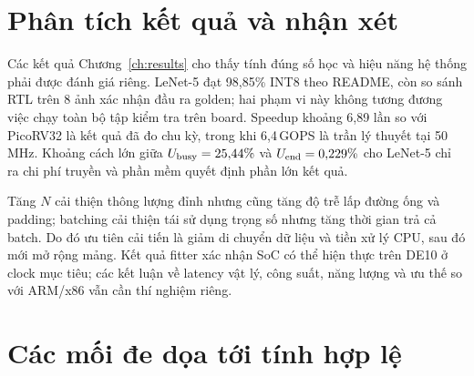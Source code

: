 \section{Phân tích kết quả và nhận xét}
\label{sec:analysis-remarks}
Các kết quả Chương~\ref{ch:results} cho thấy tính đúng số học và hiệu năng hệ thống phải được đánh giá riêng. LeNet-5 đạt 98,85\% INT8 theo README, còn so sánh RTL trên 8 ảnh xác nhận đầu ra golden; hai phạm vi này không tương đương việc chạy toàn bộ tập kiểm tra trên board. Speedup khoảng 6,89 lần so với PicoRV32 là kết quả đã đo chu kỳ, trong khi 6,4\,GOPS là trần lý thuyết tại 50\,MHz. Khoảng cách lớn giữa $U_{\rm busy}=25{,}44\%$ và $U_{\rm end}=0{,}229\%$ cho LeNet-5 chỉ ra chi phí truyền và phần mềm quyết định phần lớn kết quả.

Tăng $N$ cải thiện thông lượng đỉnh nhưng cũng tăng độ trễ lấp đường ống và padding; batching cải thiện tái sử dụng trọng số nhưng tăng thời gian trả cả batch. Do đó ưu tiên cải tiến là giảm di chuyển dữ liệu và tiền xử lý CPU, sau đó mới mở rộng mảng. Kết quả fitter xác nhận SoC có thể hiện thực trên DE10 ở clock mục tiêu; các kết luận về latency vật lý, công suất, năng lượng và ưu thế so với ARM/x86 vẫn cần thí nghiệm riêng.

\section{Các mối đe dọa tới tính hợp lệ}
